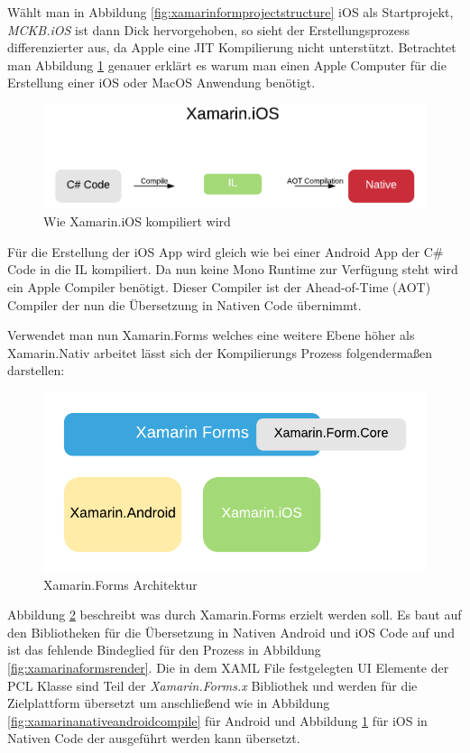 	Wählt man in Abbildung \ref{fig:xamarinformprojectstructure} iOS als Startprojekt, \textit{MCKB.iOS} ist dann Dick hervorgehoben, so sieht der Erstellungsprozess differenzierter aus, da Apple eine JIT Kompilierung nicht unterstützt. Betrachtet man Abbildung \ref{fig:xamarinanativeioscompile} genauer erklärt es warum man einen Apple Computer für die Erstellung einer iOS oder MacOS Anwendung benötigt.
	\begin{figure}[h!]
		\centering
		\includegraphics[width=1\textwidth]{images/Xamarin-iOS.png}
		\caption{Wie Xamarin.iOS kompiliert wird}
		\label{fig:xamarinanativeioscompile}
	\end{figure}

	Für die Erstellung der iOS App wird gleich wie bei einer Android App der C\# Code in die IL kompiliert. Da nun keine Mono Runtime zur Verfügung steht wird ein Apple Compiler benötigt. Dieser Compiler ist der Ahead-of-Time (AOT) Compiler der nun die Übersetzung in Nativen Code übernimmt.

	Verwendet man nun Xamarin.Forms welches eine weitere Ebene höher als Xamarin.Nativ arbeitet lässt sich der Kompilierungs Prozess folgendermaßen darstellen:
	\begin{figure}[h!]
		\centering
		\includegraphics[width=1\textwidth]{images/Xamarin-Forms.png}
		\caption{Xamarin.Forms Architektur}
		\label{fig:xamarinformsarchitecture}
	\end{figure}

	Abbildung \ref{fig:xamarinformsarchitecture} beschreibt was durch Xamarin.Forms erzielt werden soll. Es baut auf den Bibliotheken für die Übersetzung in Nativen Android und iOS Code auf und ist das fehlende Bindeglied für den Prozess in Abbildung \ref{fig:xamarinaformsrender}. Die in dem XAML File festgelegten UI Elemente der PCL Klasse sind Teil der \textit{Xamarin.Forms.x} Bibliothek und werden für die Zielplattform übersetzt um anschließend wie in Abbildung \ref{fig:xamarinanativeandroidcompile} für Android und Abbildung \ref{fig:xamarinanativeioscompile} für iOS in Nativen Code der ausgeführt werden kann übersetzt.

